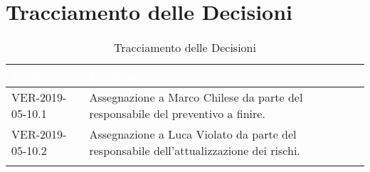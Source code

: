 \section{Tracciamento delle Decisioni}

\begin{longtable}{|C{.33\textwidth}|C{.61\textwidth}|}
\hline
{}\textbf{\textcolor{white}{Codice}} & \textbf{\textcolor{white}{Decisione}}\\
\hline
{}VER-2019-05-10.1 & Assegnazione a Marco Chilese da parte del responsabile del preventivo a finire.\\
\hline
VER-2019-05-10.2 & Assegnazione a Luca Violato da parte del responsabile dell'attualizzazione dei rischi.\\
\hline
\caption{Tracciamento delle Decisioni}
\end{longtable}
